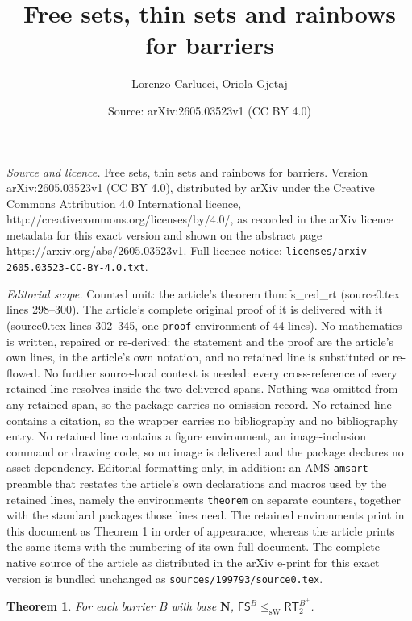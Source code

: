 \documentclass[10pt,a4paper]{amsart}
\title{\texorpdfstring{Free sets, thin sets and rainbows for barriers}{Free sets, thin sets and rainbows for barriers}}
\author{Lorenzo Carlucci, Oriola Gjetaj}
\date{Source: arXiv:2605.03523v1 (CC BY 4.0)}
\newtheorem{theorem}{Theorem}
\newcommand\FS{\mathsf{FS}}
\newcommand\Nat{\mathbf{N}}
\newcommand\RT{\mathsf{RT}}
\newcommand\sW{\mathrm{sW}}
\begin{document}
\maketitle

\noindent\emph{Source and licence.} \texorpdfstring{Free sets, thin sets and rainbows for barriers}{Free sets, thin sets and rainbows for barriers}. Version arXiv:2605.03523v1 (CC BY 4.0), distributed by arXiv under the Creative Commons Attribution 4.0 International licence, http://creativecommons.org/licenses/by/4.0/, as recorded in the arXiv licence metadata for this exact version and shown on the abstract page https://arxiv.org/abs/2605.03523v1. Full licence notice: \texttt{licenses/arxiv-2605.03523-CC-BY-4.0.txt}.\par\smallskip

\noindent\textit{Editorial scope.} Counted unit: the article's theorem thm:fs\_red\_rt (source0.tex lines 298--300). The article's complete original proof of it is delivered with it (source0.tex lines 302--345, one \texttt{proof} environment of 44 lines). No mathematics is written, repaired or re-derived: the statement and the proof are the article's own lines, in the article's own notation, and no retained line is substituted or re-flowed.  No further source-local context is needed: every cross-reference of every retained line resolves inside the two delivered spans.  Nothing was omitted from any retained span, so the package carries no omission record.  No retained line contains a citation, so the wrapper carries no bibliography and no bibliography entry.  No retained line contains a figure environment, an image-inclusion command or drawing code, so no image is delivered and the package declares no asset dependency.  Editorial formatting only, in addition: an AMS \texttt{amsart} preamble that restates the article's own declarations and macros used by the retained lines, namely the environments \texttt{theorem} on separate counters, together with the standard packages those lines need.  The retained environments print in this document as Theorem 1 in order of appearance, whereas the article prints the same items with the numbering of its own full document.  The complete native source of the article as distributed in the arXiv e-print for this exact version is bundled unchanged as \texttt{sources/199793/source0.tex}.
\begin{theorem}\label{thm:fs_red_rt}
For each barrier $B$ with base $\Nat$, $\FS^B\leq_{\sW} \RT^{B^+}_2$. 
\end{theorem}
\end{document}
